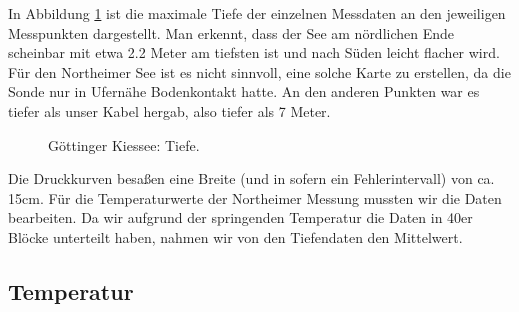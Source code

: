 \documentclass[12pt,a4paper,titlepage,headinclude,bibtotoc]{scrartcl}
\numberwithin{equation}{subsection}
\begin{document}
In Abbildung \ref{fig:tiefeGoe} ist die maximale Tiefe der einzelnen Messdaten an den jeweiligen Messpunkten dargestellt.
Man erkennt, dass der See am nördlichen Ende scheinbar mit etwa 2.2 Meter am tiefsten ist und nach Süden leicht flacher wird.
Für den Northeimer See ist es nicht sinnvoll, eine solche Karte zu erstellen, da die Sonde nur in Ufernähe Bodenkontakt hatte.
An den anderen Punkten war es tiefer als unser Kabel hergab, also tiefer als 7 Meter.

\begin{figure}[!htb]
	\centering
	
	\caption{Göttinger Kiessee: Tiefe.}
	\label{fig:tiefeGoe}
\end{figure}

Die Druckkurven besaßen eine Breite (und in sofern ein Fehlerintervall) von ca. 15cm.
Für die Temperaturwerte der Northeimer Messung mussten wir die Daten bearbeiten.
Da wir aufgrund der springenden Temperatur die Daten in 40er Blöcke unterteilt haben, nahmen wir von den Tiefendaten den Mittelwert.


\subsection{Temperatur}
\end{document}
